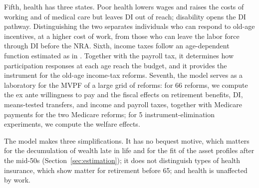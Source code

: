 Fifth, health has three states. Poor health lowers wages and raises the costs of working and of medical care but leaves DI out of reach; disability opens the DI pathway. Distinguishing the two separates individuals who can respond to old-age incentives, at a higher cost of work, from those who can leave the labor force through DI before the NRA. Sixth, income taxes follow an age-dependent function estimated as in \citet{Borella2023}. Together with the payroll tax, it determines how participation responses at each age reach the budget, and it provides the instrument for the old-age income-tax reforms. Seventh, the model serves as a laboratory for the MVPF of a large grid of reforms: for 66 reforms, we compute the ex ante willingness to pay and the fiscal effects on retirement benefits, DI, means-tested transfers, and income and payroll taxes, together with Medicare payments for the two Medicare reforms; for 5 instrument-elimination experiments, we compute the welfare effects.

The model makes three simplifications. It has no bequest motive, which matters for the decumulation of wealth late in life \citep{Denardi2010,lockwood2018incidental} and for the fit of the asset profiles after the mid-50s (Section~\ref{sec:estimation}); it does not distinguish types of health insurance, which \citet{french2011effects} show matter for retirement before 65; and health is unaffected by work.
